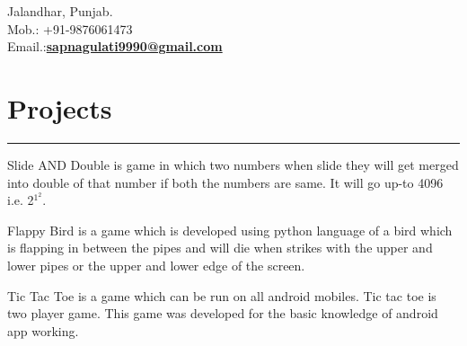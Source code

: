 \documentclass[]{sapna-resume}
\begin{document}
\begin{minipage}[t]{0.66\textwidth} 
\hspace*{0pt}\hfill    \\
\hspace*{0pt}\hfill    \\
\hspace*{0pt}\hfill Jalandhar, Punjab. \\
\hspace*{0pt}\hfill Mob.: +91-9876061473 \\
\hspace*{0pt}\hfill Email.:\textbf{\href{mailto:sapnagulati9990@gmail.com}{sapnagulati9990@gmail.com}}  
\section{Projects}
\noindent\rule{12.5cm}{0.4pt}
 
\noindent
\hspace{5em}%
\begin{minipage}{0.85\textwidth\vspace{2pt}}
Slide AND Double is game in which two numbers when slide they will get merged into double of that number if both the numbers are same. It will go up-to 4096 i.e. 2$^1^2$.
\end{minipage}
\sectionsep

 
\noindent
\hspace{5em}%
\begin{minipage}{0.85\textwidth\vspace{2pt}}
Flappy Bird is a game which is developed using python language of a bird which is flapping in between the pipes and will die when strikes with the upper and lower pipes or the upper and lower edge of the screen.
\end{minipage}
\sectionsep

 
\noindent
\hspace{5em}%
\begin{minipage}{0.85\textwidth\vspace{2pt}}
Tic Tac Toe is a game which can be run on all android mobiles. Tic
tac toe is two player game. This game was developed for the basic
knowledge of android app working.
\end{minipage}
\sectionsep


\end{minipage}
\end{document}
